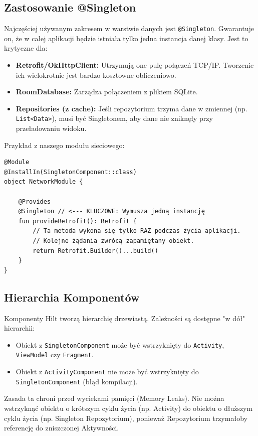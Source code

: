 \subsection{Zastosowanie @Singleton}

Najczęściej używanym zakresem w warstwie danych jest \texttt{@Singleton}. Gwarantuje on, że w całej aplikacji będzie istniała tylko jedna instancja danej klasy. Jest to krytyczne dla:
\begin{itemize}
    \item \textbf{Retrofit/OkHttpClient:} Utrzymują one pulę połączeń TCP/IP. Tworzenie ich wielokrotnie jest bardzo kosztowne obliczeniowo.
    \item \textbf{RoomDatabase:} Zarządza połączeniem z plikiem SQLite.
    \item \textbf{Repositories (z cache):} Jeśli repozytorium trzyma dane w zmiennej (np. \texttt{List<Data>}), musi być Singletonem, aby dane nie zniknęły przy przeładowaniu widoku.
\end{itemize}

Przykład z naszego modułu sieciowego:

\begin{verbatim}
@Module
@InstallIn(SingletonComponent::class)
object NetworkModule {

    @Provides
    @Singleton // <--- KLUCZOWE: Wymusza jedną instancję
    fun provideRetrofit(): Retrofit {
        // Ta metoda wykona się tylko RAZ podczas życia aplikacji.
        // Kolejne żądania zwrócą zapamiętany obiekt.
        return Retrofit.Builder()...build() 
    }
}
\end{verbatim}

\subsection{Hierarchia Komponentów}

Komponenty Hilt tworzą hierarchię drzewiastą. Zależności są dostępne "w dół" hierarchii:
\begin{itemize}
    \item Obiekt z \texttt{SingletonComponent} może być wstrzyknięty do \texttt{Activity}, \texttt{ViewModel} czy \texttt{Fragment}.
    \item Obiekt z \texttt{ActivityComponent} nie może być wstrzyknięty do \texttt{SingletonComponent} (błąd kompilacji).
\end{itemize}

Zasada ta chroni przed wyciekami pamięci (Memory Leaks). Nie można wstrzyknąć obiektu o krótszym cyklu życia (np. Activity) do obiektu o dłuższym cyklu życia (np. Singleton Repozytorium), ponieważ Repozytorium trzymałoby referencję do zniszczonej Aktywności.

